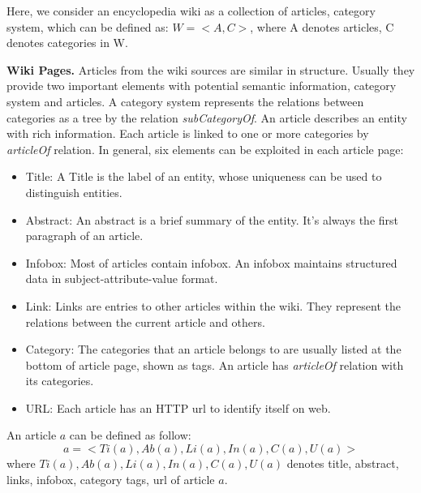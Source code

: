 \documentclass[runningheads,a4paper]{llncs}
\newcommand{\para}[1]{\vspace{0.1cm}\noindent\textbf{#1}}
\begin{document}
Here, we consider an encyclopedia wiki as a collection of articles, category system, which can be defined as: $W = <A,C>$, where A denotes articles, C denotes categories in W.

\para{Wiki Pages.} Articles from the wiki sources are similar in structure. Usually they provide two important elements with potential semantic information, category system and articles. A category system represents the relations between categories as a tree by the relation \textit{subCategoryOf}. An article describes an entity with rich information. Each article is linked to one or more categories by \textit{articleOf} relation. In general, six elements can be exploited in each article page:
\begin{itemize}
  \item Title: A Title is the label of an entity, whose uniqueness can be used to distinguish entities.
  \item Abstract: An abstract is a brief summary of the entity. It's always the first paragraph of an article.
  \item Infobox: Most of articles contain infobox. An infobox maintains structured data in subject-attribute-value format.
  \item Link: Links are entries to other articles within the wiki. They represent the relations between the current article and others.
  \item Category: The categories that an article belongs to are usually listed at the bottom of article page, shown as tags. An article has \textit{articleOf} relation with its categories.
  \item URL: Each article has an HTTP url to identify itself on web.
\end{itemize}

%
An article $a$ can be defined as follow:
\begin{equation}
    a = <Ti(a),Ab(a),Li(a),In(a),C(a),U(a)>
\end{equation}
where $Ti(a),Ab(a),Li(a),In(a),C(a),U(a)$ denotes title, abstract, links, infobox, category tags, url of article $a$.
\end{document}
